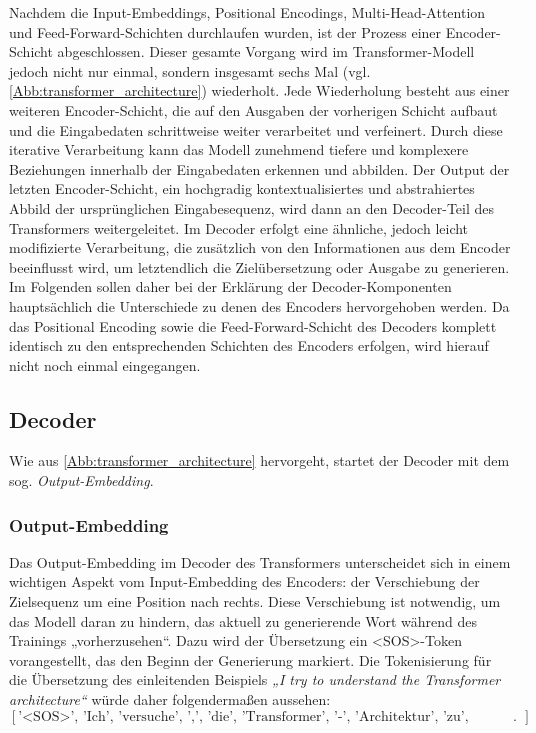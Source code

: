 Nachdem die Input-Embeddings, Positional Encodings, Multi-Head-Attention und Feed-Forward-Schichten durchlaufen wurden, ist der Prozess einer Encoder-Schicht abgeschlossen. Dieser gesamte Vorgang wird im Transformer-Modell jedoch nicht nur einmal, sondern insgesamt sechs Mal (vgl. \cref{Abb:transformer_architecture}) wiederholt. Jede Wiederholung besteht aus einer weiteren Encoder-Schicht, die auf den Ausgaben der vorherigen Schicht aufbaut und die Eingabedaten schrittweise weiter verarbeitet und verfeinert. Durch diese iterative Verarbeitung kann das Modell zunehmend tiefere und komplexere Beziehungen innerhalb der Eingabedaten erkennen und abbilden. Der Output der letzten Encoder-Schicht, ein hochgradig kontextualisiertes und abstrahiertes Abbild der ursprünglichen Eingabesequenz, wird dann an den Decoder-Teil des Transformers weitergeleitet. Im Decoder erfolgt eine ähnliche, jedoch leicht modifizierte Verarbeitung, die zusätzlich von den Informationen aus dem Encoder beeinflusst wird, um letztendlich die Zielübersetzung oder Ausgabe zu generieren. Im Folgenden sollen daher bei der Erklärung der Decoder-Komponenten hauptsächlich die Unterschiede zu denen des Encoders hervorgehoben werden. Da das Positional Encoding sowie die Feed-Forward-Schicht des Decoders komplett identisch zu den entsprechenden Schichten des Encoders erfolgen, wird hierauf nicht noch einmal eingegangen.

\subsection*{Decoder}
Wie aus \cref{Abb:transformer_architecture} hervorgeht, startet der Decoder mit dem sog. \emph{Output-Embedding}.

\subsubsection*{Output-Embedding}

Das Output-Embedding im Decoder des Transformers unterscheidet sich in einem wichtigen Aspekt vom Input-Embedding des Encoders: der Verschiebung der Zielsequenz um eine Position nach rechts. Diese Verschiebung ist notwendig, um das Modell daran zu hindern, das aktuell zu generierende Wort während des Trainings „vorherzusehen“. Dazu wird der Übersetzung ein <SOS>-Token vorangestellt, das den Beginn der Generierung markiert. Die Tokenisierung für die Übersetzung des einleitenden Beispiels \emph{„I try to understand the Transformer architecture“} würde daher folgendermaßen aussehen:
$$[\text{'<SOS>', 'Ich', 'versuche', ',', 'die', 'Transformer', '-', 'Architektur', 'zu', 'verstehen'}].$$

